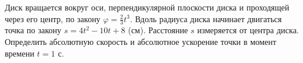 Диск вращается вокруг оси, перпендикулярной плоскости диска и проходящей
через его центр, по закону $\varphi=\frac{2}{3}t^3$. Вдоль радиуса диска
начинает двигаться точка по закону $s=4t^2-10t+8$ (см). Расстояние
$s$ измеряется от центра диска. Определить абсолютную скорость и
абсолютное ускорение точки в момент времени $t=1$ с.

